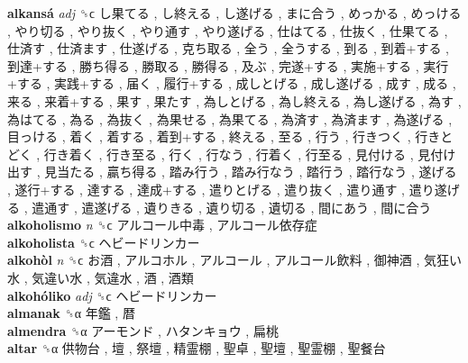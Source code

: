 \textbf{alkansá} \emph{adj}  ␝ϲ   し果てる ,  し終える ,  し遂げる ,  まに合う ,  めっかる ,  めっける ,  やり切る ,  やり抜く ,  やり通す ,  やり遂げる ,  仕はてる ,  仕抜く ,  仕果てる ,  仕済す ,  仕済ます ,  仕遂げる ,  克ち取る ,  全う ,  全うする ,  到る ,  到着+する ,  到達+する ,  勝ち得る ,  勝取る ,  勝得る ,  及ぶ ,  完遂+する ,  実施+する ,  実行+する ,  実践+する ,  届く ,  履行+する ,  成しとげる ,  成し遂げる ,  成す ,  成る ,  来る ,  来着+する ,  果す ,  果たす ,  為しとげる ,  為し終える ,  為し遂げる ,  為す ,  為はてる ,  為る ,  為抜く ,  為果せる ,  為果てる ,  為済す ,  為済ます ,  為遂げる ,  目っける ,  着く ,  着する ,  着到+する ,  終える ,  至る ,  行う ,  行きつく ,  行きとどく ,  行き着く ,  行き至る ,  行く ,  行なう ,  行着く ,  行至る ,  見付ける ,  見付け出す ,  見当たる ,  贏ち得る ,  踏み行う ,  踏み行なう ,  踏行う ,  踏行なう ,  遂げる ,  遂行+する ,  達する ,  達成+する ,  遣りとげる ,  遣り抜く ,  遣り通す ,  遣り遂げる ,  遣通す ,  遣遂げる ,  遺りきる ,  遺り切る ,  遺切る ,  間にあう ,  間に合う   \\
\textbf{alkoholismo} \emph{n}  ␝ϲ   アルコール中毒 ,  アルコール依存症   \\
\textbf{alkoholista} ␝ϲ   ヘビードリンカー   \\
\textbf{alkohòl} \emph{n}  ␝ϲ   お酒 ,  アルコホル ,  アルコール ,  アルコール飲料 ,  御神酒 ,  気狂い水 ,  気違い水 ,  気違水 ,  酒 ,  酒類   \\
\textbf{alkohóliko} \emph{adj}  ␝ϲ   ヘビードリンカー   \\
\textbf{almanak} ␝α   年鑑 ,  暦   \\
\textbf{almendra} ␝α   アーモンド ,  ハタンキョウ ,  扁桃   \\
\textbf{altar} ␝α   供物台 ,  壇 ,  祭壇 ,  精霊棚 ,  聖卓 ,  聖壇 ,  聖霊棚 ,  聖餐台   \\
